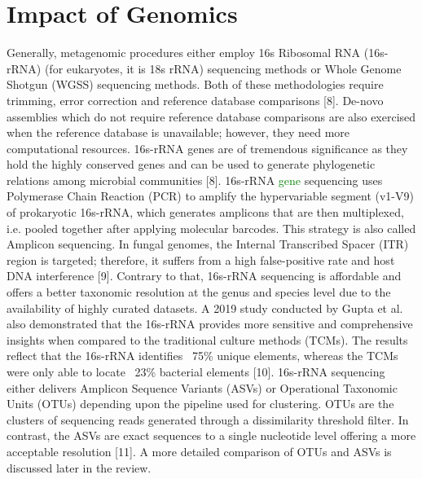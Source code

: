 \section{Impact of Genomics}
Generally, metagenomic procedures either employ 16s Ribosomal RNA (16s-rRNA) (for eukaryotes, it is 18s rRNA) sequencing methods or Whole Genome Shotgun (WGSS) sequencing methods. Both of these methodologies require trimming, error correction and reference database comparisons [8]. De-novo assemblies which do not require reference database comparisons are also exercised when the reference database is unavailable; however, they need more computational resources. 16s-rRNA genes are of tremendous significance as they hold the highly conserved genes and can be used to generate phylogenetic relations among microbial communities [8]. 16s-rRNA \textcolor{green}{gene} sequencing uses Polymerase Chain Reaction (PCR) to amplify the hypervariable segment (v1-V9) of prokaryotic 16s-rRNA, which generates amplicons that are then multiplexed, i.e. pooled together after applying molecular barcodes. This strategy is also called Amplicon sequencing. In fungal genomes, the Internal Transcribed Spacer (ITR) region is targeted; therefore,  it suffers from a high false-positive rate and host DNA interference [9]. Contrary to that, 16s-rRNA sequencing is affordable and offers a better taxonomic resolution at the genus and species level due to the availability of highly curated datasets. A 2019 study conducted by Gupta et al. also demonstrated that the 16s-rRNA provides more sensitive and comprehensive insights when compared to the traditional culture methods (TCMs). The results reflect that the 16s-rRNA identifies ~75\% unique elements, whereas the TCMs were only able to locate ~23\% bacterial elements [10]. 16s-rRNA sequencing either delivers Amplicon Sequence Variants (ASVs) or Operational Taxonomic Units (OTUs) depending upon the pipeline used for clustering. OTUs are the clusters of sequencing reads generated through a dissimilarity threshold filter. In contrast, the ASVs are exact sequences to a single nucleotide level offering a more acceptable resolution [11]. A more detailed comparison of OTUs and ASVs is discussed later in the review.

